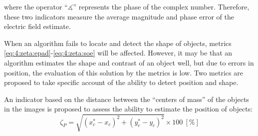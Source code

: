 			\noindent where the operator ``$\measuredangle$'' represents the phase of the complex number. Therefore, these two indicators measure the average magnitude and phase error of the electric field estimate.
			
			When an algorithm fails to locate and detect the shape of objects, metrics \eqref{eq:4:zeta:epad}-\eqref{eq:4:zeta:soe} will be affected. However, it may be that an algorithm estimates the shape and contrast of an object well, but due to errors in position, the evaluation of this solution by the metrics is low. Two metrics are proposed to take specific account of the ability to detect position and shape.
			
			An indicator based on the distance between the ``centers of mass'' of the objects in the images is proposed to assess the ability to estimate the position of objects:
			\begin{equation}
				\zeta_P  = \sqrt{(x^*_c-x_c)^2 + (y^*_c-y_c)^2}\times 100~[\%] \label{eq:4:zeta:p}
			\end{equation}
			

